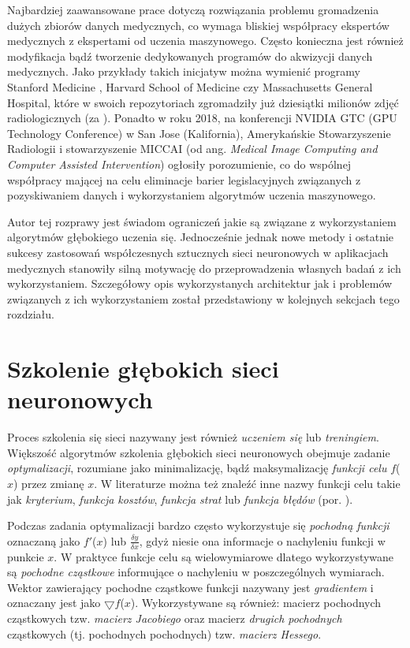 Najbardziej zaawansowane prace dotyczą rozwiązania problemu gromadzenia dużych zbiorów danych medycznych, co wymaga bliskiej współpracy ekspertów medycznych z ekspertami od uczenia maszynowego. Często konieczna jest również modyfikacja bądź tworzenie dedykowanych programów do akwizycji danych medycznych. Jako przykłady takich inicjatyw można wymienić programy Stanford Medicine \cite{MedicalImageNet}, Harvard School of Medicine \cite{HMS} czy Massachusetts General Hospital, które w swoich repozytoriach zgromadziły już dziesiątki milionów zdjęć radiologicznych (za \cite{MGH}). Ponadto w roku 2018, na konferencji NVIDIA GTC (GPU Technology Conference) w San Jose (Kalifornia), Amerykańskie Stowarzyszenie Radiologii i stowarzyszenie MICCAI (od ang. \textit{Medical Image Computing and Computer Assisted Intervention}) ogłosiły porozumienie, co do wspólnej współpracy mającej na celu eliminacje barier legislacyjnych związanych z pozyskiwaniem danych i wykorzystaniem algorytmów uczenia maszynowego.

Autor tej rozprawy jest świadom ograniczeń jakie są związane z wykorzystaniem algorytmów głębokiego uczenia się. Jednocześnie jednak nowe metody i ostatnie sukcesy zastosowań współczesnych sztucznych sieci neuronowych w aplikacjach medycznych stanowiły silną motywację do przeprowadzenia własnych badań z ich wykorzystaniem. Szczegółowy opis wykorzystanych architektur jak i problemów związanych z ich wykorzystaniem został przedstawiony w kolejnych sekcjach tego rozdziału.
 

\section{Szkolenie głębokich sieci neuronowych}

Proces szkolenia się sieci nazywany jest również \textit{uczeniem się} lub \textit{treningiem}. Większość algorytmów szkolenia głębokich sieci neuronowych obejmuje zadanie \textit{optymalizacji}, rozumiane jako minimalizację, bądź maksymalizację \textit{funkcji celu} $f$($x$) przez zmianę $x$. W literaturze można też znaleźć inne nazwy funkcji celu takie jak \textit{kryterium}, \textit{funkcja kosztów}, \textit{funkcja strat} lub \textit{funkcja błędów} (por. \cite{Goodfellow-et-al-2016}). 

Podczas zadania optymalizacji bardzo często wykorzystuje się \textit{pochodną funkcji} oznaczaną jako $f'$($x$) lub $\frac{\delta y}{\delta x}$, gdyż niesie ona informacje o nachyleniu funkcji \linebreak w punkcie $x$. W praktyce funkcje celu są wielowymiarowe dlatego wykorzystywane są \textit{pochodne cząstkowe} informujące o nachyleniu w poszczególnych wymiarach. Wektor zawierający pochodne cząstkowe funkcji nazywany jest \textit{gradientem} i oznaczany jest jako $\bigtriangledown f$($x$). Wykorzystywane są również: macierz pochodnych cząstkowych tzw. \textit{macierz Jacobiego} oraz macierz \textit{drugich pochodnych} cząstkowych (tj. pochodnych pochodnych) tzw. \textit{macierz Hessego}.

